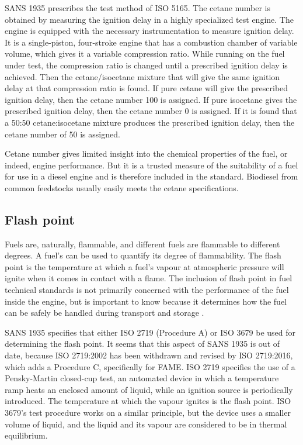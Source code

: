 SANS 1935 prescribes the test method of ISO 5165. The cetane number is obtained
by measuring the ignition delay in a highly specialized test engine. The engine
is equipped with the necessary instrumentation to measure ignition delay. It is
a single-piston, four-stroke engine that has a combustion chamber of variable
volume, which gives it a variable compression ratio. While running on the fuel
under test, the compression ratio is changed until a prescribed ignition delay
is achieved. Then the cetane/isocetane mixture that will give the same ignition
delay at that compression ratio is found. If pure cetane will give the
prescribed ignition delay, then the cetane number 100 is assigned. If pure
isocetane gives the prescribed ignition delay, then the cetane number 0 is
assigned. If it is found that a 50:50 cetane:isocetane mixture produces the
prescribed ignition delay, then the cetane number of 50 is assigned.

Cetane number gives limited insight into the chemical properties of the fuel, or
indeed, engine performance. But it is a trusted measure of the suitability of a
fuel for use in a diesel engine and is therefore included in the standard.
Biodiesel from common feedstocks usually easily meets the cetane specifications.

\subsection{Flash point}

Fuels are, naturally, flammable, and different fuels are flammable to different
degrees. A fuel's  can be used to quantify its degree of
flammability. The flash point is the temperature at which a fuel's vapour at
atmospheric pressure will ignite when it comes in contact with a flame. The
inclusion of flash point in fuel technical standards is not primarily concerned
with the performance of the fuel inside the engine, but is important to know
because it determines how the fuel can be safely be handled during transport and
storage \autocite{WFCC2009}.

SANS 1935 specifies that either ISO 2719 (Procedure A) or ISO 3679 be used for
determining the flash point. It seems that this aspect of SANS 1935 is out of
date, because ISO 2719:2002 has been withdrawn and revised by ISO 2719:2016,
which adds a Procedure C, specifically for FAME. ISO 2719 specifies the use of a
Pensky-Martin closed-cup test, an automated device in which a temperature ramp
heats an enclosed amount of liquid, while an ignition source is periodically
introduced. The temperature at which the vapour ignites is the flash point. ISO
3679's test procedure works on a similar principle, but the device uses a
smaller volume of liquid, and the liquid and its vapour are considered to be in
thermal equilibrium.

